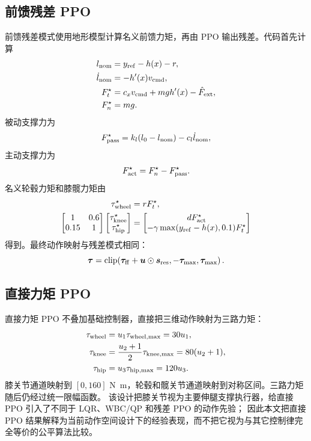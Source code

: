 \documentclass[UTF8,12pt,a4paper,fontset=none]{ctexart}
\begin{document}
\subsection{前馈残差 PPO}
前馈残差模式使用地形模型计算名义前馈力矩，再由 PPO 输出残差。代码首先计算
\begin{align}
l_{\rm nom}&=y_{\rm ref}-h(x)-r,\\
\dot l_{\rm nom}&=-h'(x)v_{\rm cmd},\\
F_t^\star&=c_xv_{\rm cmd}+mgh'(x)-\hat F_{\rm ext},\\
F_n^\star&=mg.
\end{align}
被动支撑力为
\begin{equation}
F_{\rm pass}^\star=k_l(l_0-l_{\rm nom})-c_l\dot l_{\rm nom},
\end{equation}
主动支撑力为
\begin{equation}
F_{\rm act}^\star=F_n^\star-F_{\rm pass}^\star.
\end{equation}
名义轮毂力矩和膝髋力矩由
\begin{align}
\tau_{\rm wheel}^\star&=rF_t^\star,\\
\begin{bmatrix}
1 & 0.6\\
0.15 & 1
\end{bmatrix}
\begin{bmatrix}
\tau_{\rm knee}^\star\\
\tau_{\rm hip}^\star
\end{bmatrix}
&=
\begin{bmatrix}
dF_{\rm act}^\star\\
-\gamma\max(y_{\rm ref}-h(x),0.1)F_t^\star
\end{bmatrix}
\end{align}
得到。最终动作映射与残差模式相同：
\begin{equation}
\bm\tau=\operatorname{clip}\!\left(\bm\tau_{\rm ff}+\bm u\odot\bm s_{\rm res},
-\bm\tau_{\max},\bm\tau_{\max}\right).
\end{equation}

\subsection{直接力矩 PPO}
直接力矩 PPO 不叠加基础控制器，直接把三维动作映射为三路力矩：
\begin{align}
\tau_{\rm wheel}&=u_1\tau_{{\rm wheel},\max}=30u_1,\\
\tau_{\rm knee}&=\frac{u_2+1}{2}\tau_{{\rm knee},\max}=80(u_2+1),\\
\tau_{\rm hip}&=u_3\tau_{{\rm hip},\max}=120u_3.
\end{align}
膝关节通道映射到 $[0,160]$ \si{N.m}，轮毂和髋关节通道映射到对称区间。三路力矩随后仍经过统一限幅函数。
该设计把膝关节视为主要伸腿支撑执行器，给直接 PPO 引入了不同于 LQR、WBC/QP 和残差 PPO 的动作先验；
因此本文把直接 PPO 结果解释为当前动作空间设计下的经验表现，而不把它视为与其它控制律完全等价的公平算法比较。
\end{document}
